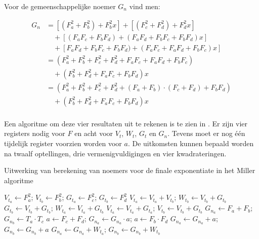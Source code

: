 Voor de gemeenschappelijke noemer $G_n$ vind men:

\[\begin{aligned}
G_n	&= [(F_a^2 + F_b^2) + F_b^2 x] + [(F_c^2 + F_d^2) + F_d^2x]\\
			&\quad + [(F_a F_c + F_b F_d) + (F_a F_d + F_b F_c + F_b F_d)x]\\
			&\quad + [F_a F_d + F_b F_c + F_b F_d) + (F_a F_c + F_a F_d + F_b F_c)x]\\
		&= (F_a^2 + F_b^2 + F_c^2 + F_d^2 + F_a F_c + F_a F_d + F_b F_c)\\
			&\quad + (F_b^2 + F_d^2 + F_a F_c + F_b F_d)x\\
		&= (F_a^2 + F_b^2 + F_c^2 + F_d^2 + (F_a + F_b) \cdot (F_c + F_d) + F_b F_d)\\
			&\quad + (F_b^2 + F_d^2 + F_a F_c + F_b F_d)x\\
\end{aligned}\]

Een algoritme om deze vier resultaten uit te rekenen is te zien in . Er zijn vier registers nodig voor $F$ en acht voor $V_t$, $W_t$, $G_t$ en $G_n$. Tevens moet er nog \'e\'en tijdelijk register voorzien worden voor $a$. De uitkomsten kunnen bepaald worden na twaalf optellingen, drie vermenigvuldigingen en vier kwadrateringen.

\begin{algorithm}[h]
	\caption{Uitwerking van berekening van noemers voor de finale exponentiate in het Miller algoritme}
	\label{algoritme-implementatie-miller-final-noemers}
	$V_{t_a} \leftarrow F_a^2$; $V_{t_b} \leftarrow F_b^2$; $G_{t_a} \leftarrow F_c^2$; $G_{t_b} \leftarrow F_d^2$\;
	$V_{t_a} \leftarrow V_{t_a} + V_{t_b}$; $W_{t_b} \leftarrow V_{t_b} + G_{t_b}$\;
	$G_{t_b} \leftarrow V_{t_b} + G_{t_b}$; $W_{t_a} \leftarrow V_{t_a} + G_{t_b}$\;
	$V_{t_a} \leftarrow V_{t_a} + G_{t_a}$; $V_{t_b} \leftarrow V_{t_b} + G_{t_b}$\;
	$G_{n_a} \leftarrow F_a + F_b$; $G_{n_b} \leftarrow T_a \cdot T_c$\;
	$a \leftarrow F_c + F_d$; $G_{n_a} \leftarrow G_{n_a} \cdot a$; $a \leftarrow F_b \cdot F_d$\;
	$G_{n_a} \leftarrow G_{n_a} + a$; $G_{n_b} \leftarrow G_{n_b} + a$\;
	$G_{n_a} \leftarrow G_{n_a} + W_{t_a}$; $G_{n_b} \leftarrow G_{n_b} + W_{t_b}$\;
\end{algorithm}

